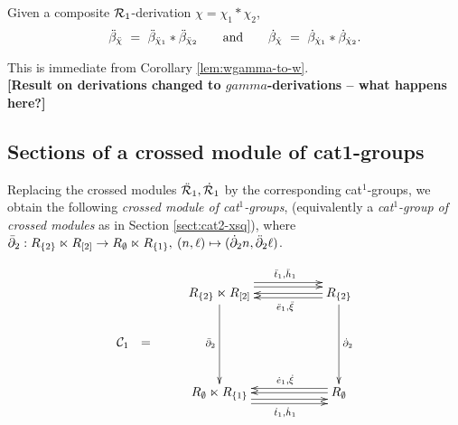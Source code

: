 \begin{lem}
Given a composite $\mathcal{R}_1$-derivation $\chi = \chi_1 * \chi_2$, 
$$
\ddot{\beta}_{\ddot{\chi}} ~=~ \ddot{\beta}_{\ddot{\chi}_1} * \ddot{\beta}_{\ddot{\chi}_2} 
\qquad \mbox{and} \qquad
 \dot{\beta}_{\dot{\chi}}  ~=~ \dot{\beta}_{\dot{\chi}_1} * \dot{\beta}_{\dot{\chi}_2}.
$$
\end{lem}
\begin{pf}
This is immediate from Corollary \ref{lem:wgamma-to-w}. \\
{\bf [Result on derivations changed to $gamma$-derivations 
-- what happens here?]}
\end{pf}



\newpage
\subsection{Sections of a crossed module of cat1-groups}

Replacing the crossed modules $\ddot{\mathcal{R}}_1, \dot{\mathcal{R}}_1$  by the corresponding
cat$^1$-groups, we obtain the following 
\emph{crossed module of cat$^1$-groups},
(equivalently a \emph{cat$^1$-group of crossed modules} 
as in Section \ref{sect:cat2-xsq}), where
$\bar{\partial}_2 : 
 R_{\{2\}} \ltimes R_{[2]} \to R_{\emptyset} \ltimes R_{\{1\}}, \: 
 (n, \ell) \mapsto (\dot{\partial}_2 n, \ddot{\partial}_2 \ell)$.

\begin{equation} 
\vcenter{\xymatrix{
 & R_{\{2\}} \ltimes R_{[2]} \ar[dd]_{\barbdyt}
     \ar[rr] <+1.2ex>  \ar[rr] <+2.0ex> ^(0.55){\ddtto,\ddhho}
     &&  R_{\{2\}}   \ar[dd]^{\dbdyt}  
             \ar[ll] \ar[ll] <+0.8ex> ^(0.45){\ddeeo,\ddx} \\
\calC_1 ~~=
 &   &&   \\
 & R_{\emptyset} \ltimes R_{\{1\}}  
     \ar[rr] <-1.2ex>  \ar[rr] <-2.0ex> _(0.55){\dtto,\dhho}
     &&  R_{\emptyset} \ar[ll]  \ar[ll] <-0.8ex> _(0.45){\deeo,\dx} 
 \\
}}
\end{equation}

